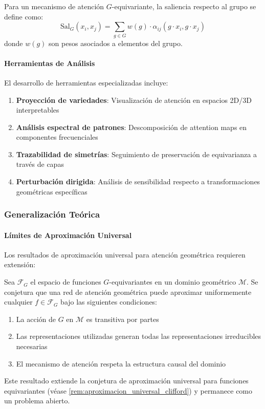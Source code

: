 \begin{definition}
Para un mecanismo de atención $G$-equivariante, la saliencia respecto al grupo se define como:
\begin{equation}
\text{Sal}_G(x_i, x_j) = \sum_{g \in G} w(g) \cdot \alpha_{ij}(g \cdot x_i, g \cdot x_j)
\label{eq:geometric_saliency}
\end{equation}
donde $w(g)$ son pesos asociados a elementos del grupo.
\end{definition}

\paragraph{Herramientas de Análisis}

El desarrollo de herramientas especializadas incluye:

\begin{enumerate}
    \item \textbf{Proyección de variedades}: Visualización de atención en espacios 2D/3D interpretables
    \item \textbf{Análisis espectral de patrones}: Descomposición de attention maps en componentes frecuenciales
    \item \textbf{Trazabilidad de simetrías}: Seguimiento de preservación de equivarianza a través de capas
    \item \textbf{Perturbación dirigida}: Análisis de sensibilidad respecto a transformaciones geométricas específicas
\end{enumerate}

\subsubsection{Generalización Teórica}

\paragraph{Límites de Aproximación Universal}

Los resultados de aproximación universal para atención geométrica requieren extensión:

\begin{remark}
Sea $\mathcal{F}_G$ el espacio de funciones $G$-equivariantes en un dominio geométrico $\mathcal{M}$. Se conjetura que una red de atención geométrica puede aproximar uniformemente cualquier $f \in \mathcal{F}_G$ bajo las siguientes condiciones:
\begin{enumerate}
    \item La acción de $G$ en $\mathcal{M}$ es transitiva por partes
    \item Las representaciones utilizadas generan todas las representaciones irreducibles necesarias
    \item El mecanismo de atención respeta la estructura causal del dominio
\end{enumerate}
Este resultado extiende la conjetura de aproximación universal para funciones equivariantes (véase \autoref{rem:aproximacion_universal_clifford}) y permanece como un problema abierto.
\end{remark}


